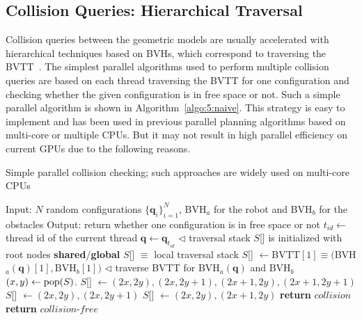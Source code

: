 \subsection{Collision Queries: Hierarchical Traversal}
Collision queries between the geometric models are usually accelerated with hierarchical techniques based on BVHs,
which correspond to traversing the BVTT~\cite{LGLM00}. The simplest parallel algorithms
used to perform multiple collision queries are based on each thread traversing the BVTT for one configuration and checking whether the given configuration is
in free space or not. Such a simple parallel algorithm is shown in Algorithm~\ref{algo:5:naive}. This
strategy is easy to implement and has been used in previous parallel planning algorithms based on multi-core or multiple CPUs.
But it may not result in high parallel efficiency on current GPUs due to the following reasons.
\begin{algorithm}[htb]
    \caption{Simple parallel collision checking; such approaches are widely used on multi-core CPUs}
    \label{algo:5:naive}
    \begin{algorithmic}[1]
    \STATE Input: $N$ random configurations $\{\mathbf{q}_i\}_{i=1}^N$, BVH$_a$ for the robot and BVH$_b$ for the obstacles
    \STATE Output: return whether one configuration is in free space or not
    \STATE $t_{id} \leftarrow $ thread id of the current thread
    \STATE $\mathbf{q} \leftarrow \mathbf{q}_{t_{id}}$
    \STATE $\lhd$ traversal stack $S$[] is initialized with root nodes
    \STATE \textbf{shared}/\textbf{global} $S$[] $\equiv$ local traversal stack
    \STATE $S$[] $\leftarrow $BVTT$[1] \equiv ($BVH$_a(\mathbf{q})[1],$BVH$_b[1])$
    \STATE $\lhd$ traverse BVTT for BVH$_a(\mathbf{q})$ and BVH$_b$
    \LOOP
    \STATE $(x,y) \leftarrow \operatorname{pop}(S)$.
            \STATE $S$[] $\leftarrow (2x,2y),(2x,2y+1),(2x+1,2y),(2x+1,2y+1)$
        \ENDIF
            \STATE $S$[] $\leftarrow (2x,2y),(2x,2y+1)$
        \ENDIF
            \STATE $S$[] $\leftarrow (2x,2y),(2x+1,2y)$
        \ENDIF
            \STATE \textbf{return} $collision$
        \ENDIF
    \ENDIF
    \ENDLOOP
    \STATE \textbf{return} $collision\text{-}free$
    \end{algorithmic}
\end{algorithm}
